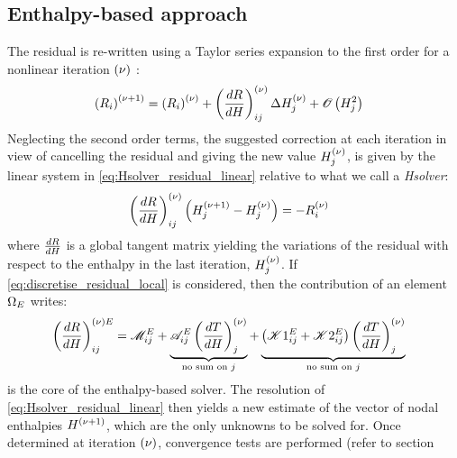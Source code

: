 \subsection{Enthalpy-based approach }
The residual is re-written using a Taylor series expansion to the first order for a nonlinear iteration ${\left( \nu \right)}$ :
\begin{align}
\label{eq:Hsolver_residual}
& \left( R_i \right)^{{\left( \nu+1 \right)}} = \left( R_i \right)^{{\left( \nu \right)}} + \left( \frac{dR}{dH} \right)^{{\left( \nu \right)}}_{ij} \Delta H_j^{{\left( \nu \right)}} + \mathscr{O}\left( H_j^2 \right)
\end{align}
Neglecting the second order terms, the suggested correction at each iteration in view of cancelling 
the residual and giving the new value $H_j^{{\left( \nu \right)}}$, is given by the linear system in \cref{eq:Hsolver_residual_linear}
relative to what we call a \emph{Hsolver}:
\begin{align}
\label{eq:Hsolver_residual_linear}
& \left( \frac{dR}{dH} \right)^{{\left( \nu \right)}}_{ij} \left( H_j^{{\left( \nu+1 \right)}} - H_j^{{\left( \nu \right)}} \right) = -R_i^{{\left( \nu \right)}}
\end{align}
where $\frac{dR}{dH}$ is a global tangent matrix yielding the variations of the residual with respect to the enthalpy 
in the last iteration, $H_j^{{\left( \nu \right)}}$. If \cref{eq:discretise_residual_local} is considered, then the contribution of an element $\Omega_E$ writes:
\begin{align}
\label{eq:dRdH}
& \left( \frac{dR}{dH} \right)^{{\left( \nu \right)} E}_{ij} 
= \mathscr{M}_{ij}^E 
+ \underbrace{\mathscr{A}_{ij}^E \left( \frac{dT}{dH} \right)^{{\left( \nu \right)}}_{j}}_{\text{no sum on }j}
+ \underbrace{\left( \mathscr{K}1_{ij}^E + \mathscr{K}2_{ij}^E \right) \left( \frac{dT}{dH} \right)^{{\left( \nu \right)}}_{j}}_{\text{no sum on }j}
\end{align}
 is the core of the enthalpy-based solver. The resolution of \cref{eq:Hsolver_residual_linear} 
then yields a new estimate of the vector of nodal enthalpies $H^{{\left( \nu+1 \right)}}$, which are the only unknowns to be solved for. 
Once determined at iteration ${\left( \nu \right)}$, convergence tests are performed (refer to section %
%
%
